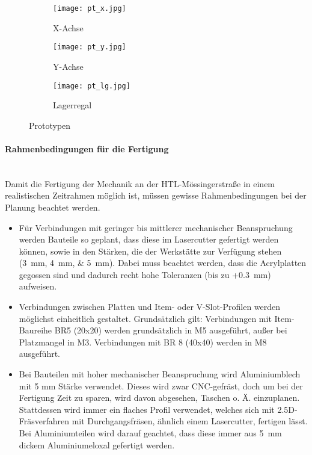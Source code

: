 \begin{figure}[H]
    \centering
    \begin{subfigure}{.3\textwidth}
        \centering
        \texttt{[image: pt\_x.jpg]}
        \caption{X-Achse}
        \label{pts:plt_x}
    \end{subfigure}%
    \begin{subfigure}{.3\textwidth}
        \centering
        \texttt{[image: pt\_y.jpg]}
        \caption{Y-Achse}
        \label{pts:plt_y}
    \end{subfigure}%
    \begin{subfigure}{.3\textwidth}
        \centering
        \texttt{[image: pt\_lg.jpg]}
        \caption{Lagerregal}
        \label{pts:plt_ls}
    \end{subfigure}
    \caption{Prototypen}
    \label{pts}
\end{figure}
\vspace{-3mm}

\paragraph{Rahmenbedingungen für die Fertigung}\mbox{}\\
Damit die Fertigung der Mechanik an der HTL-Mössingerstraße in einem realistischen Zeitrahmen möglich ist, müssen gewisse Rahmenbedingungen bei der Planung beachtet werden.
\begin{itemize}
    \item Für Verbindungen mit geringer bis mittlerer mechanischer Beanspruchung werden Bauteile so geplant, dass diese im Lasercutter gefertigt werden können, sowie in den Stärken, die der Werkstätte zur Verfügung stehen (\qtylist{3;4;5}{\milli\meter}). Dabei muss beachtet werden, dass die Acrylplatten gegossen sind und dadurch recht hohe Toleranzen (bis zu +\SI{0.3}{\milli\meter}) aufweisen.
    \item Verbindungen zwischen Platten und Item- oder V-Slot-Profilen werden möglichst einheitlich gestaltet. Grundsätzlich gilt: Verbindungen mit Item-Baureihe BR5 (20x20) werden grundsätzlich in M5 ausgeführt, außer bei Platzmangel in M3. Verbindungen mit BR 8 (40x40) werden in M8 ausgeführt.
    \item Bei Bauteilen mit hoher mechanischer Beanspruchung wird Aluminiumblech mit 5 mm Stärke verwendet. Dieses wird zwar CNC-gefräst, doch um bei der Fertigung Zeit zu sparen, wird davon abgesehen, Taschen o. Ä. einzuplanen. Stattdessen wird immer ein flaches Profil verwendet, welches sich mit 2.5D-Fräsverfahren mit Durchgangsfräsen, ähnlich einem Lasercutter, fertigen lässt. Bei Aluminiumteilen wird darauf geachtet, dass diese immer aus \SI{5}{\mm} dickem Aluminiumeloxal gefertigt werden.
\end{itemize}



